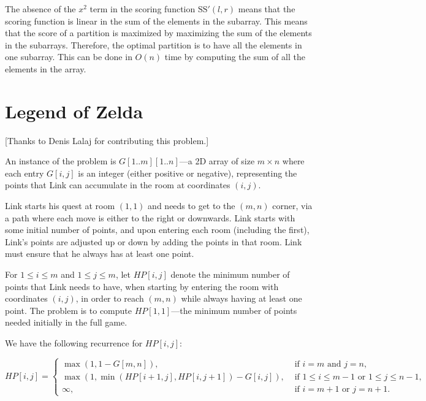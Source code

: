 \documentclass[11pt,fleqn]{exam}
\newenvironment{soln}{\color{solnblue}}{}
\newcommand{\subsum}{\mbox{SS}}
\newif\ifsolutions\solutionstrue
\newif\ifsolutions\solutionsfalse
\begin{document}
\begin{questions}
\begin{soln}
   The absence of the $x^2$ term in the scoring function $\subsum'(l,r)$ 
   means that the scoring function is linear in the sum of the 
   elements in the subarray. This means that the score of a partition 
   is maximized by maximizing the sum of the elements in the subarrays. 
   Therefore, the optimal partition is to have all the elements in one subarray. 
   This can be done in $O(n)$ time by computing the sum of all the elements in the array.
\end{soln}

\ifsolutions

\else
\fi

\end{questions}

\newpage

\section{Legend of Zelda}

[Thanks to Denis Lalaj for contributing this problem.]

\vspace{.1in}

An instance of the problem is $G[1..m][1..n]$---a 2D array of size $m \times n$ where each entry $G[i,j]$ is an integer (either positive or negative), representing the points  that Link can accumulate in the room at coordinates $(i,j)$. 

Link starts his quest at room $(1,1)$ and needs to get to the $(m,n)$ corner, via a path where each move is either to the right or downwards. Link starts with some initial number of points, and upon entering each room (including the first), Link's points are adjusted up or down by adding the points in that room. Link must ensure that he always has at least one point.

For $1 \le i \le m$ and $1\le j \le m$, let $HP[i,j]$ denote the minimum number of points that Link needs to have, when starting by entering the room with coordinates $(i, j)$, in order to reach $(m,n)$ while always having at least one point. The problem is to compute $HP[1,1]$---the minimum number of points needed initially in the full game.

We have the following recurrence for $HP[i,j]$:

\[
HP[i,j] = \left\{\begin{array}{ll}
\max(1, 1-G[m,n]), & \mbox{ if  $i=m$ and  $j=n$},\\
\max(1, \min(HP[i+1,j], HP[i,j+1]) -  G[i,j]), & \mbox{ if $1 \le i \le m-1$ or $1\le j \le n-1$}, \\
\infty,  & \mbox{ if $i = m+1$ or $j = n+1$}.
\end{array}
\right.
\]
\end{document}

